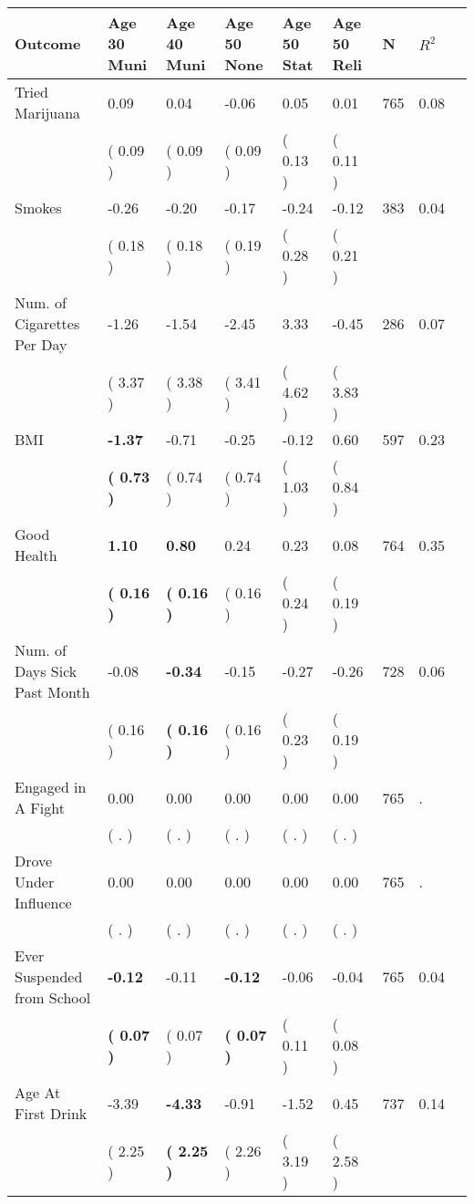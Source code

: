 \begin{tabular}{L{6.2cm} C{1.8cm} C{1.8cm} C{1.8cm} C{1.8cm} C{1.8cm} C{1.8cm} C{0.3cm} C{0.3cm}}
\toprule
 \textbf{Outcome} & \textbf{Age 30 Muni} & \textbf{Age 40 Muni} & \textbf{Age 50 None} & \textbf{Age 50 Stat} & \textbf{Age 50 Reli} & \textbf{N} & \textbf{$ R^2$} \\
\midrule
Tried Marijuana &      0.09 &      0.04 &     -0.06 &      0.05 &      0.01  & 765 &       0.08 \\ 
 & (     0.09 ) & (     0.09 ) & (     0.09 ) & (     0.13 ) & (     0.11 )  & \\
Smokes &     -0.26 &     -0.20 &     -0.17 &     -0.24 &     -0.12  & 383 &       0.04 \\ 
 & (     0.18 ) & (     0.18 ) & (     0.19 ) & (     0.28 ) & (     0.21 )  & \\
Num. of Cigarettes Per Day &     -1.26 &     -1.54 &     -2.45 &      3.33 &     -0.45  & 286 &       0.07 \\ 
 & (     3.37 ) & (     3.38 ) & (     3.41 ) & (     4.62 ) & (     3.83 )  & \\
BMI & \textbf{    -1.37} &     -0.71 &     -0.25 &     -0.12 &      0.60  & 597 &       0.23 \\ 
 & \textbf{(     0.73 )} & (     0.74 ) & (     0.74 ) & (     1.03 ) & (     0.84 )  & \\
Good Health & \textbf{     1.10} & \textbf{     0.80} &      0.24 &      0.23 &      0.08  & 764 &       0.35 \\ 
 & \textbf{(     0.16 )} & \textbf{(     0.16 )} & (     0.16 ) & (     0.24 ) & (     0.19 )  & \\
Num. of Days Sick Past Month &     -0.08 & \textbf{    -0.34} &     -0.15 &     -0.27 &     -0.26  & 728 &       0.06 \\ 
 & (     0.16 ) & \textbf{(     0.16 )} & (     0.16 ) & (     0.23 ) & (     0.19 )  & \\
Engaged in A Fight &      0.00 &      0.00 &      0.00 &      0.00 &      0.00  & 765 &          . \\ 
 & (        . ) & (        . ) & (        . ) & (        . ) & (        . )  & \\
Drove Under Influence &      0.00 &      0.00 &      0.00 &      0.00 &      0.00  & 765 &          . \\ 
 & (        . ) & (        . ) & (        . ) & (        . ) & (        . )  & \\
Ever Suspended from School & \textbf{    -0.12} &     -0.11 & \textbf{    -0.12} &     -0.06 &     -0.04  & 765 &       0.04 \\ 
 & \textbf{(     0.07 )} & (     0.07 ) & \textbf{(     0.07 )} & (     0.11 ) & (     0.08 )  & \\
Age At First Drink &     -3.39 & \textbf{    -4.33} &     -0.91 &     -1.52 &      0.45  & 737 &       0.14 \\ 
 & (     2.25 ) & \textbf{(     2.25 )} & (     2.26 ) & (     3.19 ) & (     2.58 )  & \\
\bottomrule
\end{tabular}
